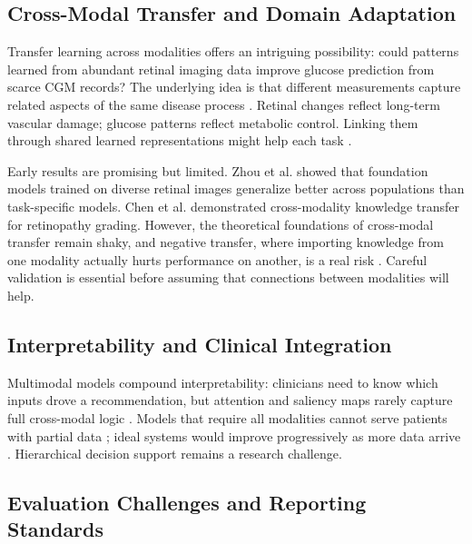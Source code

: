 \subsection{Cross-Modal Transfer and Domain Adaptation}

Transfer learning across modalities offers an intriguing possibility: could patterns learned from abundant retinal imaging data improve glucose prediction from scarce CGM records? The underlying idea is that different measurements capture related aspects of the same disease process \cite{contreras2018artificial, fahmy2025exploring}. Retinal changes reflect long-term vascular damage; glucose patterns reflect metabolic control. Linking them through shared learned representations might help each task \cite{bai2024federated}.

Early results are promising but limited. Zhou et al. \cite{zhou2023population} showed that foundation models trained on diverse retinal images generalize better across populations than task-specific models. Chen et al. \cite{chen2024crossmodality} demonstrated cross-modality knowledge transfer for retinopathy grading. However, the theoretical foundations of cross-modal transfer remain shaky, and negative transfer, where importing knowledge from one modality actually hurts performance on another, is a real risk \cite{prioleau2025deep, wang2024ai}. Careful validation is essential before assuming that connections between modalities will help.

\subsection{Interpretability and Clinical Integration}

Multimodal models compound interpretability: clinicians need to know which inputs drove a recommendation, but attention and saliency maps rarely capture full cross-modal logic \cite{jacobs2023artificial, mackenzie2023diabetes, zhu2021deep}. Models that require all modalities cannot serve patients with partial data \cite{ghosh2025artificial}; ideal systems would improve progressively as more data arrive \cite{wang2024ai, mackenzie2023diabetes, guan2023artificial}. Hierarchical decision support remains a research challenge.

\subsection{Evaluation Challenges and Reporting Standards}

